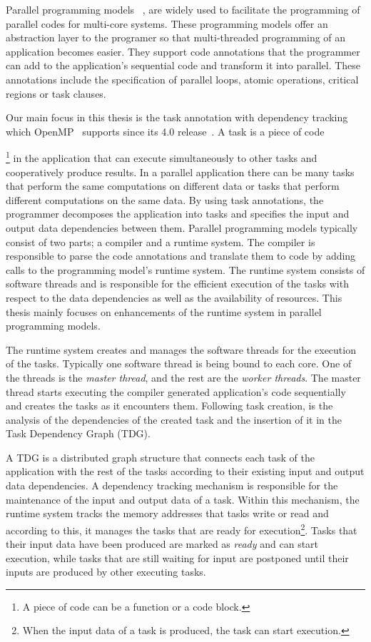 

Parallel programming models ~\cite{Blumofe:PPoPP1995, Reinders2007, Bauer2012, OmpSs},  are widely used to facilitate the programming of parallel codes for multi-core systems.
These programming models offer an abstraction layer to the programer so that multi-threaded programming of an application becomes easier.
They support code annotations that the programmer can add to the application's sequential code and transform it into parallel.
These annotations include the specification of parallel loops, atomic operations, critical regions or task clauses.

Our main focus in this thesis is the task annotation with dependency tracking which OpenMP~\cite{OpenMP} supports since its 4.0 release~\cite{OpenMP4.0:Manual2015}.
A task is a piece of code{\footnote{A piece of code can be a function or a code block.} in the application that can execute simultaneously to other tasks and cooperatively produce results.
In a parallel application there can be many tasks that perform the same computations on different data or tasks that perform different computations on the same data.
By using task annotations, the programmer decomposes the application into tasks and specifies the input and output data dependencies between them.
Parallel programming models typically consist of two parts; a compiler and a runtime system.
The compiler is responsible to parse the code annotations and translate them to code by adding calls to the programming model's runtime system.
The runtime system consists of software threads and is responsible for the efficient execution of the tasks with respect to the data dependencies as well as the availability of resources.
This thesis mainly focuses on enhancements of the runtime system in parallel programming models.

The runtime system creates and manages the software threads for the execution of the tasks. 
Typically one software thread is being bound to each core. 
One of the threads is the \textit{master thread}, and the rest are the \textit{worker threads}. 
The master thread starts executing the compiler generated application's code sequentially and creates the tasks as it encounters them. 
Following task creation, is the analysis of the dependencies of the created task and the insertion of it in the Task Dependency Graph (TDG).

A TDG is a distributed graph structure that connects each task of the application with the rest of the tasks according to their existing input and output data dependencies.
A dependency tracking mechanism is responsible for the maintenance of the input and output data of a task.
Within this mechanism, the runtime system tracks the memory addresses that tasks write or read and according to this, it manages the tasks that are ready for execution\footnote{When the input data of a task is produced, the task can start execution.}.
Tasks that their input data have been produced are marked as \textit{ready} and can start execution, while tasks that are still waiting for input are postponed until their inputs are produced by other executing tasks.

}
